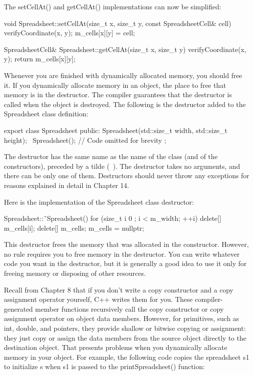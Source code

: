 The setCellAt() and getCellAt() implementations can now be simplified:

\begin{cpp}
void Spreadsheet::setCellAt(size_t x, size_t y, const SpreadsheetCell& cell)
{
    verifyCoordinate(x, y);
    m_cells[x][y] = cell;
}

SpreadsheetCell& Spreadsheet::getCellAt(size_t x, size_t y)
{
    verifyCoordinate(x, y);
    return m_cells[x][y];
}
\end{cpp}


Whenever you are finished with dynamically allocated memory, you should free it. If you dynamically allocate memory in an object, the place to free that memory is in the destructor. The compiler guarantees that the destructor is called when the object is destroyed. The following is the destructor added to the Spreadsheet class definition:

\begin{cpp}
export class Spreadsheet
{
    public:
        Spreadsheet(std::size_t width, std::size_t height);
        ~Spreadsheet();
        // Code omitted for brevity
};
\end{cpp}

The destructor has the same name as the name of the class (and of the constructors), preceded by a tilde (~). The destructor takes no arguments, and there can be only one of them. Destructors should never throw any exceptions for reasons explained in detail in Chapter 14.

Here is the implementation of the Spreadsheet class destructor:

\begin{cpp}
Spreadsheet::˜Spreadsheet()
{
    for (size_t i { 0 }; i < m_width; ++i) {
        delete[] m_cells[i];
    }
    delete[] m_cells;
    m_cells = nullptr;
}
\end{cpp}

This destructor frees the memory that was allocated in the constructor. However, no rule requires you to free memory in the destructor. You can write whatever code you want in the destructor, but it is generally a good idea to use it only for freeing memory or disposing of other resources.


Recall from Chapter 8 that if you don’t write a copy constructor and a copy assignment operator yourself, C++ writes them for you. These compiler-generated member functions recursively call the copy constructor or copy assignment operator on object data members. However, for primitives, such as int, double, and pointers, they provide shallow or bitwise copying or assignment: they just copy or assign the data members from the source object directly to the destination object. That presents problems when you dynamically allocate memory in your object. For example, the following code copies the spreadsheet s1 to initialize s when s1 is passed to the printSpreadsheet() function:

